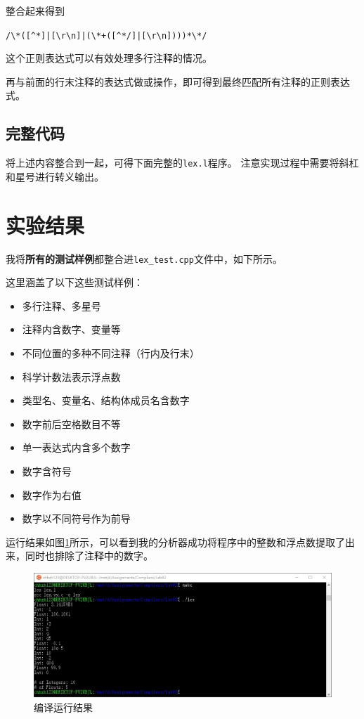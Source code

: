 \documentclass[logo,reportComp]{thesis}
\begin{document}
整合起来得到
\begin{center}
\verb'/\*([^*]|[\r\n]|(\*+([^*/]|[\r\n])))*\*/'
\end{center}
这个正则表达式可以有效处理多行注释的情况。

再与前面的行末注释的表达式做或操作，即可得到最终匹配所有注释的正则表达式。

\subsection{完整代码}
将上述内容整合到一起，可得下面完整的\verb'lex.l'程序。
注意实现过程中需要将斜杠和星号进行转义输出。


\section{实验结果}
我将\textbf{所有的测试样例}都整合进\verb'lex_test.cpp'文件中，如下所示。


这里涵盖了以下这些测试样例：
\begin{itemize}
	\item 多行注释、多星号
	\item 注释内含数字、变量等
	\item 不同位置的多种不同注释（行内及行末）
	\item 科学计数法表示浮点数
	\item 类型名、变量名、结构体成员名含数字
	\item 数字前后空格数目不等
	\item 单一表达式内含多个数字
	\item 数字含符号
	\item 数字作为右值
	\item 数字以不同符号作为前导
\end{itemize}

运行结果如图\ref{fig:results}所示，可以看到我的分析器成功将程序中的整数和浮点数提取了出来，同时也排除了注释中的数字。
\begin{figure}[H]
\centering
\includegraphics[width=\linewidth]{fig/results.jpg}
\caption{编译运行结果}
\label{fig:results}
\end{figure}
\end{document}

